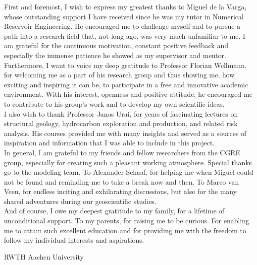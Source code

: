 \documentclass[a4paper,11pt]{MScThesis}
\begin{document}
    \cleardoublepage
%
    First and foremost, I wish to express my greatest thanks to Miguel de la Varga, whose outstanding support I have received since he was my tutor in Numerical Reservoir Engineering. He encouraged me to challenge myself and to pursue a path into a research field that, not long ago, was very much unfamiliar to me. I am grateful for the continuous motivation, constant positive feedback and especially the immense patience he showed as my supervisor and mentor.\\
    Furthermore, I want to voice my deep gratitude to Professor Florian Wellmann, for welcoming me as a part of his research group and thus showing me, how exciting and inspiring it can be, to participate in a free and innovative academic environment. With his interest, openness and positive attitude, he encouraged me to contribute to his group's work and to develop my own scientific ideas.\\
    I also wish to thank Professor Janos Urai, for years of fascinating lectures on structural geology, hydrocarbon exploration and production, and related risk analysis. His courses provided me with many insights and served as a sources of inspiration and information that I was able to include in this project.\\
    In general, I am grateful to my friends and fellow researchers from the CGRE group, especially for creating such a pleasant working atmosphere. Special thanks go to the modeling team. To Alexander Schaaf, for helping me when Miguel could not be found and reminding me to take a break now and then. To Marco van Veen, for endless inciting and exhilarating discussions, but also for the many shared adventures during our geoscientific studies.\\
    And of course, I owe my deepest gratitude to my family, for a lifetime of unconditional support. To my parents, for raising me to be curious. For enabling me to attain such excellent education and for providing me with the freedom to follow my individual interests and aspirations.
    \vspace*{15mm}

    \noindent 
    RWTH Aachen University \hfill \mscname\\ %
    \mscdate

%
    \tocloflot
%
%
    \begin{acronym}%
    \end{acronym}%
    \cleardoublepage%
%
%
%
\mainmatter
%
\end{document}
